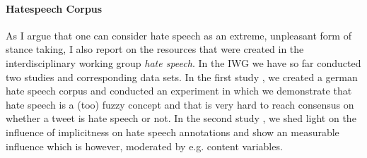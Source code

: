 \documentclass[11pt]{article}
\begin{document}
\paragraph{Hatespeech Corpus \cite{hatespeech2016}}
As I argue that one can consider hate speech as an extreme, unpleasant form of stance taking, I also report on the resources that were created in the interdisciplinary working group \textit{hate speech}.
In the IWG we have so far conducted two studies and corresponding data sets.
In the first study \cite{hatespeech2016}, we created a german hate speech corpus and conducted an experiment in which we demonstrate that hate speech is a (too) fuzzy concept and that is very hard to reach consensus on whether a tweet is hate speech or not.
In the second study \cite{hatespeech2017implicitness}, we shed light on the influence of implicitness on hate speech annotations and show an measurable influence which is however, moderated by e.g. content variables. 

%
%
%
%
%
%
\end{document}
